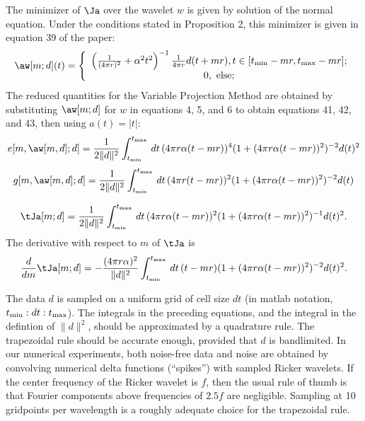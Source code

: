 The minimizer of $\Ja $ over the wavelet $w$ is given by solution of the normal equation. Under the conditions stated in Proposition 2, this minimizer is given in equation 39 of the paper:
\begin{equation}
  \label{eqn:normsol}
  \aw[m;d](t) = \left\{
    \begin{array}{c}
      \left(\frac{1}{(4\pi r)^2} + \alpha^2
      t^2\right)^{-1}\frac{1}{4 \pi r}d(t+mr), t \in [t_{\rm
      min}-mr, t_{\rm max}-mr];\\
      0, \mbox{ else;}
    \end{array}
  \right.
\end{equation}
The reduced quantities for the Variable Projection Method are obtained by substituting $\aw[m;d]$ for $w$ in equations 4, 5, and 6 to obtain equations 41, 42, and 43, then using $a(t)=|t|$:
\begin{equation}
  \label{eqn:residnormgen}
  e[m,\aw[m,d];d] = \frac{1}{2\|d\|^2}\int_{t_{\rm min}}^{t_{\rm max}} \,dt\,(4\pi r \alpha (t-mr))^4(1 +
  (4\pi r \alpha (t-mr))^2)^{-2}d(t)^2
\end{equation}
\begin{equation}
  \label{eqn:anninormgen}
  g[m,\aw[m,d];d] = \frac{1}{2\|d\|^2}\int_{t_{\rm min}}^{t_{\rm max}} \,dt\,(4\pi r (t-mr))^2(1 +
  (4\pi r \alpha (t-mr))^2)^{-2}d(t)
\end{equation}

\begin{equation}
  \label{eqn:expjgen}
\tJa[m;d] = \frac{1}{2\|d\|^2}\int_{t_{\rm min}}^{t_{\rm max}}\,dt\,(4\pi r \alpha (t-mr))^2(1+(4\pi r \alpha 
(t-mr))^2)^{-1}d(t)^2. 
\end{equation}
The derivative with respect to $m$ of $\tJa $ is
\begin{equation}
  \label{eqn:dexpjgen}
  \frac{d}{dm}\tJa[m;d] = -\frac{(4 \pi r \alpha)^2}{\|d\|^2} \int_{t_{\rm min}}^{t_{\rm max}} \,dt \,  (t-mr)(1+(4\pi r \alpha (t-mr))^2)^{-2}d(t)^2. 
\end{equation}

The data $d$ is sampled on a uniform grid of cell size $dt$ (in matlab notation, $t_{\rm min}:dt:t_{\rm max}$). The integrals in the preceding equations, and the integral in the defintion of $\|d\|^2$, should be approximated by a quadrature rule. The trapezoidal rule should be accurate enough, provided that $d$ is bandlimited. In our numerical experiments, both noise-free data and noise are obtained by convolving numerical delta functions (``spikes'') with sampled Ricker wavelets. If the center frequency of the Ricker wavelet is $f$, then the usual rule of thumb is that Fourier components above frequencies of $2.5f$ are negligible. Sampling at 10 gridpoints per wavelength is a roughly adequate choice for the trapezoidal rule.

